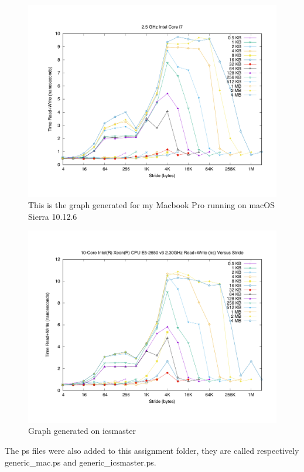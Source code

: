 \documentclass[unicode,11pt,a4paper,oneside,numbers=endperiod,openany]{scrartcl}
\begin{document}
\begin{enumerate}
        \begin{figure}[H]
            \includegraphics[width=\linewidth]{./results/generic_mac.pdf}
            \caption{This is the graph generated for my Macbook Pro running on macOS Sierra 10.12.6}
        \end{figure}
        \begin{figure}[H]
            \includegraphics[width=\linewidth]{./results/generic_icsmaster.pdf}
            \caption{Graph generated on icsmaster}
        \end{figure}
           
        The ps files were also added to this assignment folder, they are called respectively generic\_mac.ps and generic\_icsmaster.ps.



\end{enumerate}
\end{document}
